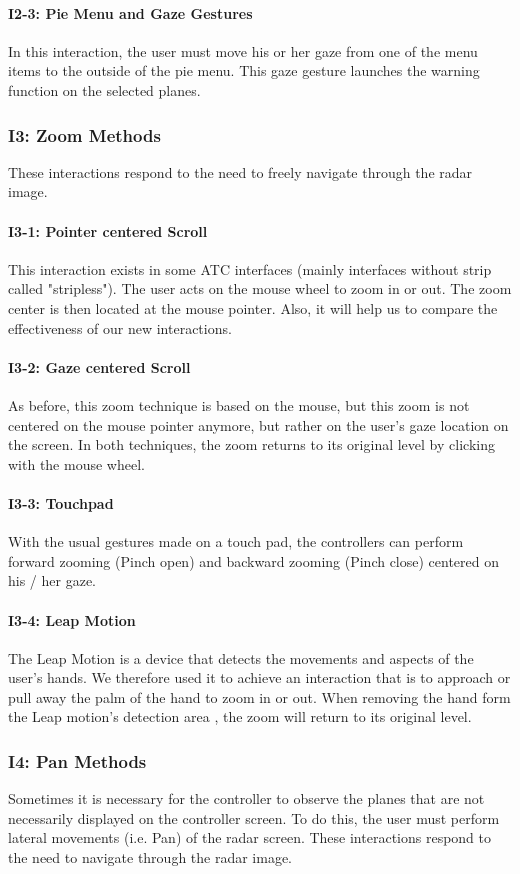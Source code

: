\paragraph{I2-3: Pie Menu and Gaze Gestures}
In this interaction, the user must move his or her gaze from
one of the menu items to the outside of the pie menu. This
gaze gesture launches the warning function on the selected
planes.
\subsubsection{I3: Zoom Methods}
These interactions respond to the need to freely navigate
through the radar image.
\paragraph{I3-1: Pointer centered Scroll}
This interaction exists in some ATC interfaces (mainly
interfaces without strip called "stripless"). The user acts on
the mouse wheel to zoom in or out. The zoom center is then
located at the mouse pointer. Also, it will help us to compare
the effectiveness of our new interactions.
\paragraph{I3-2: Gaze centered Scroll}
As before, this zoom technique is based on the mouse, but
this zoom is not centered on the mouse pointer anymore, but
rather on the user's gaze location on the screen. In both
techniques, the zoom returns to its original level by clicking
with the mouse wheel.
\paragraph{I3-3: Touchpad}
With the usual gestures made on a touch pad, the controllers
can perform forward zooming (Pinch open) and backward
zooming (Pinch close) centered on his / her gaze.
\paragraph{I3-4: Leap Motion}
The Leap Motion is a device that detects the movements and
aspects of the user's hands. We therefore used it to achieve
an interaction that is to approach or pull away the palm of
the hand to zoom in or out. When removing the hand form
the Leap motion's detection area , the zoom will return to
its original level.

\subsubsection{I4: Pan Methods}
Sometimes it is necessary for the controller to observe the
planes that are not necessarily displayed on the controller
screen. To do this, the user must perform lateral movements
(i.e. Pan) of the radar screen. These interactions respond to
the need to navigate through the radar image.
